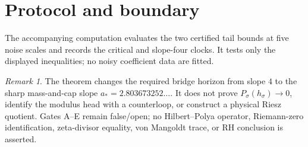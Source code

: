 \documentclass[11pt]{article}
\theoremstyle{remark}\newtheorem{remark}[theorem]{Remark}
\begin{document}
\section{Protocol and boundary}
The accompanying computation evaluates the two certified tail bounds at
five noise scales and records the critical and slope-four clocks.  It tests
only the displayed inequalities; no noisy coefficient data are fitted.

\begin{remark}
The theorem changes the required bridge horizon from slope $4$ to the sharp
mass-and-cap slope $a_*=2.803673252\ldots$.  It does not prove
$P_\sigma(h_\sigma)\to0$, identify the modulus head with a counterloop, or
construct a physical Riesz quotient.  Gates A--E remain false/open; no
Hilbert--Polya operator, Riemann-zero identification, zeta-divisor equality,
von Mangoldt trace, or RH conclusion is asserted.
\end{remark}
\end{document}
